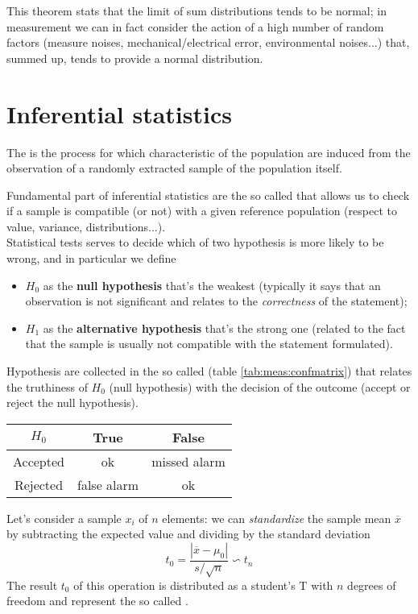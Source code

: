 	This theorem stats that the limit of sum distributions tends to be normal; in measurement we can in fact consider the action of a high number of random factors (measure noises, mechanical/electrical error, environmental noises...) that, summed up, tends to provide a normal distribution.
	
\section{Inferential statistics}
	The  is the process for which characteristic of the population are induced from the observation of a randomly extracted sample of the population itself.
	
	Fundamental part of inferential statistics are the so called  that allows us to check if a sample is compatible (or not) with a given reference population (respect to value, variance, distributions...).\\
	Statistical tests serves to decide which of two hypothesis is more likely to be wrong,  and in particular we define
	\begin{itemize}
		\item $H_0$ as the \textbf{null hypothesis} that's the weakest (typically it says that an observation is not significant and relates to the \textit{correctness} of the statement);
		\item $H_1$ as the \textbf{alternative hypothesis} that's the strong one (related to the fact that the sample is usually not compatible with the statement formulated).
	\end{itemize}
	
	Hypothesis are collected in the so called  (table \ref{tab:meas:confmatrix}) that relates the truthiness of $H_0$ (null hypothesis) with the decision of the outcome  (accept or reject the null hypothesis).
	
	\begin{SCtable}[0.8][bht]
		\begin{tabular}{c|c c}
			$H_0$ & True & False \\ \hline 
			Accepted & ok & missed alarm \\
			Rejected & false alarm  & ok
		\end{tabular}
		\caption{confusion matrix.} \label{tab:meas:confmatrix}
	\end{SCtable}
		
	Let's consider a sample $x_i$ of $n$ elements: we can \textit{standardize} the sample mean $\overline x$ by subtracting the expected value and dividing by the standard deviation
	\begin{equation}
		t_0 = \frac{|\overline x - \mu_0|}{s/\sqrt n} \backsim t_n
	\end{equation}
	The result $t_0$ of this operation is distributed as a student's T with $n$ degrees of freedom and represent the so called .
	
